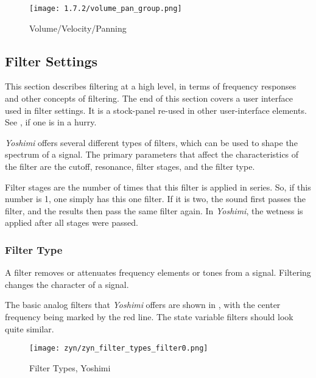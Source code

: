 \begin{figure}[H]
   \centering
   \texttt{[image: 1.7.2/volume\_pan\_group.png]}
   \caption{Volume/Velocity/Panning}
   \label{fig:volume_pan_group}
\end{figure}

\subsection{Filter Settings}
\label{subsec:filter_settings}

   This section describes filtering at a high level, in terms of frequency
   responses and other concepts of filtering.
   The end of this section covers a user interface used in filter settings.
   It is a stock-panel re-used in other user-interface elements.
   See ,
   if one is in a hurry.

   \textsl{Yoshimi}
   offers several different types of filters, which can be used to
   shape the spectrum of a signal. The primary parameters that affect the
   characteristics of the filter are the cutoff, resonance, filter stages, and
   the filter type.

   Filter stages are the number of times that this filter is applied in
   series. So, if this number is 1, one simply has this one filter. If it is
   two, the sound first passes the filter, and the results then pass the same
   filter again. In \textsl{Yoshimi}, the wetness is applied after all
   stages were passed.

\subsubsection{Filter Type}
\label{subsubsec:filter_type}

   A filter removes or attenuates frequency elements or tones from a signal.
   Filtering changes the character of a signal.

   The basic analog filters that \textsl{Yoshimi}
   offers are shown in , with
   the center frequency being marked by the red
   line. The state variable filters should look quite similar.

\begin{figure}[H]          %
   \centering
   \texttt{[image: zyn/zyn\_filter\_types\_filter0.png]}
   \caption[Basic Filter Types]{Filter Types, Yoshimi}
   \label{fig:basic_filter_types}
\end{figure}

